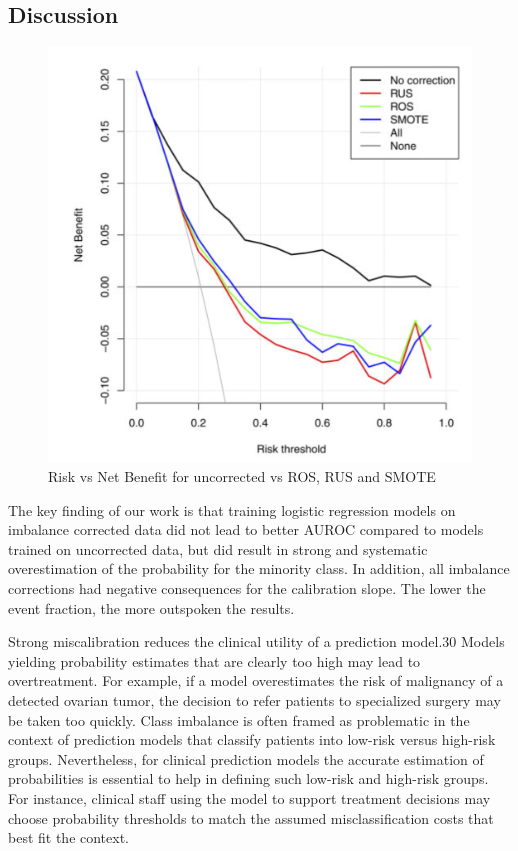 \subsection{Discussion}
	\begin{figure}[h]
         	\includegraphics[height=0.5\textheight]{assets/harm_class_imbalance_corr/risk_benefit_SMOTE_RUS_ROS.png}
         	\caption{Risk vs Net Benefit for uncorrected vs ROS, RUS and SMOTE}
         \end{figure}
	The key finding of our work is that training logistic regression models on imbalance corrected data did not lead to better AUROC 
	compared to models trained on uncorrected data, but did result in strong and systematic overestimation of the probability for the minority class. 
	In addition, all imbalance corrections had negative consequences for the calibration slope. 
	The lower the event fraction, the more outspoken the results.
	
	Strong miscalibration reduces the clinical utility of a prediction model.30 Models yielding probability estimates that are clearly too high may lead to overtreatment. 
	For example, if a model overestimates the risk of malignancy of a detected ovarian tumor, the decision to refer patients to specialized surgery may be taken too quickly. 
	Class imbalance is often framed as problematic in the context of prediction models that classify patients into low-risk versus high-risk groups. 
	Nevertheless, for clinical prediction models the accurate estimation of probabilities is essential to help in defining such low-risk and high-risk groups. 
	For instance, clinical staff using the model to support treatment decisions may choose probability thresholds
	to match the assumed misclassification costs that best fit the context.
	
